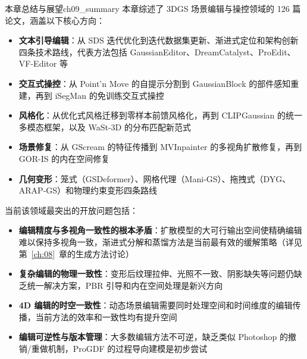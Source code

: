 \begin{futurebox}{本章总结与展望}{ch09_summary}
本章综述了 3DGS 场景编辑与操控领域的 126 篇论文，涵盖以下核心方向：
\begin{itemize}
\item \textbf{文本引导编辑}：从 SDS 迭代优化到迭代数据集更新、渐进式定位和架构创新四条技术路线，代表方法包括 GaussianEditor、DreamCatalyst、ProEdit、VF-Editor 等
\item \textbf{交互式操控}：从 Point'n Move 的自提示分割到 GaussianBlock 的部件感知重建，再到 iSegMan 的免训练交互式操控
\item \textbf{风格化}：从优化式风格迁移到零样本前馈风格化，再到 CLIPGaussian 的统一多模态框架，以及 WaSt-3D 的分布匹配新范式
\item \textbf{场景修复}：从 GScream 的特征传播到 MVInpainter 的多视角扩散修复，再到 GOR-IS 的内在空间修复
\item \textbf{几何变形}：笼式（GSDeformer）、网格代理（Mani-GS）、拖拽式（DYG、ARAP-GS）和物理约束变形四条路线
\end{itemize}

当前该领域最突出的开放问题包括：
\begin{itemize}
\item \textbf{编辑精度与多视角一致性的根本矛盾}：扩散模型的大可行输出空间使精确编辑难以保持多视角一致，渐进式分解和蒸馏方法是当前最有效的缓解策略（详见第~\ref{ch:08}~章的生成方法讨论）
\item \textbf{复杂编辑的物理一致性}：变形后纹理拉伸、光照不一致、阴影缺失等问题仍缺乏统一解决方案，PBR 引导和内在空间处理是新兴方向
\item \textbf{4D 编辑的时空一致性}：动态场景编辑需要同时处理空间和时间维度的编辑传播，当前方法的效率和一致性均有提升空间
\item \textbf{编辑可逆性与版本管理}：大多数编辑方法不可逆，缺乏类似 Photoshop 的撤销/重做机制，ProGDF 的过程导向建模是初步尝试
\end{itemize}
\end{futurebox}
